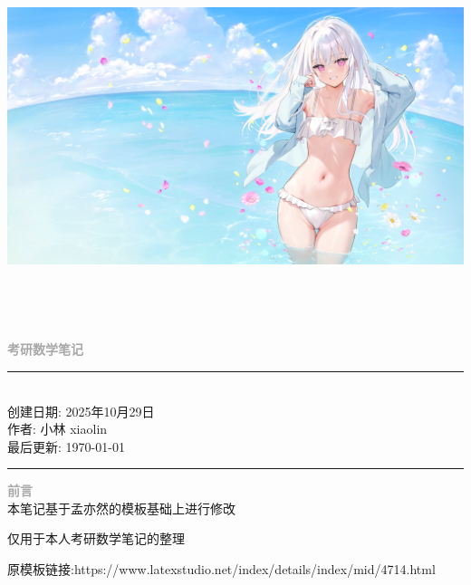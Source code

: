 \documentclass[a4paper,12pt]{article}
\begin{document}
\parindent=0pt
\includegraphics[width=21cm,height=11cm,]{picture/fengmiantu.jpg  }
\begin{center}
     \vspace*{5cm}
    {\Huge \bfseries \textcolor{darkgray}{考研数学笔记}}\\[0.3em]
    \vspace*{4cm}
    \rule{\textwidth}{0.5pt}\\[1em]
    
    {\small 创建日期: 2025年10月29日}\\[0.2em]
    {\small 作者: 小林 xiaolin}\\[0.2em]
    {\small 最后更新: \today}\\[1em]
    \rule{\textwidth}{0.5pt}
\end{center}

\vspace{1em}
\newpage
{}
 {\Huge \bfseries \textcolor{darkgray}{前言}}\\[0.3em]

本笔记基于孟亦然的模板基础上进行修改

仅用于本人考研数学笔记的整理 

原模板链接:https://www.latexstudio.net/index/details/index/mid/4714.html

\newpage

{\small
\tableofcontents
}
\vspace{1.5em}

\newpage
\end{document}
